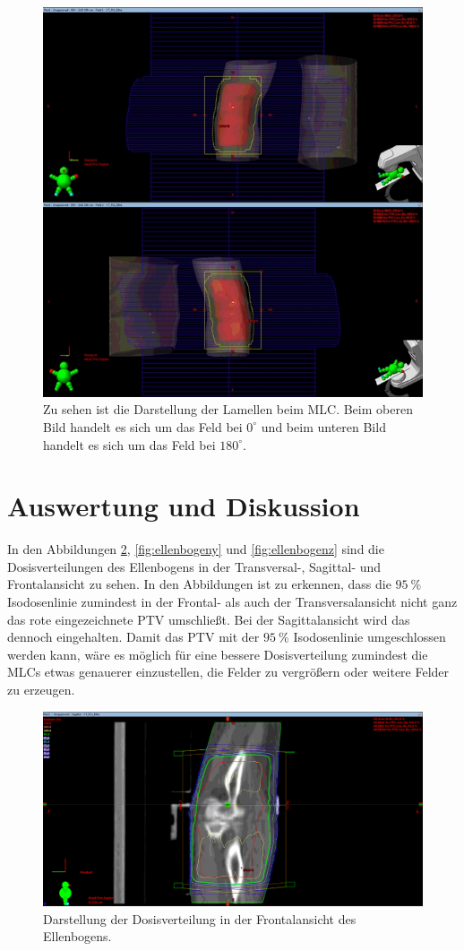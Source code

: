 \begin{figure}[htpb]
	\centering
	\includegraphics[width=0.7\linewidth]{../Bilder/kombi}
	\caption{Zu sehen ist die Darstellung der Lamellen beim MLC. Beim oberen Bild handelt es sich um das Feld bei $0^\circ$ und beim unteren Bild handelt es sich um das Feld bei $180^\circ$.}
	\label{fig:kombi}
\end{figure}


\section{Auswertung und Diskussion}
\label{sec:AuswertundDiskussion}
In den Abbildungen \ref{fig:ellenbogenx}, \ref{fig:ellenbogeny} und \ref{fig:ellenbogenz} sind die Dosisverteilungen des Ellenbogens in der Transversal-, Sagittal- und Frontalansicht zu sehen. In den Abbildungen ist zu erkennen, dass die $\SI{95}{\percent}$ Isodosenlinie zumindest in der Frontal- als auch der Transversalansicht nicht ganz das rote eingezeichnete PTV umschließt. Bei der Sagittalansicht wird das dennoch eingehalten. 
Damit das PTV mit der $\SI{95}{\percent}$ Isodosenlinie umgeschlossen werden kann, wäre es möglich für eine bessere Dosisverteilung zumindest die MLCs etwas genauerer einzustellen, die Felder zu vergrößern oder weitere Felder zu erzeugen.

\begin{figure}[htpb]
	\centering
	\includegraphics[width=0.7\linewidth]{../Bilder/EllenbogenX}
	\caption{Darstellung der Dosisverteilung in der Frontalansicht des Ellenbogens.}
	\label{fig:ellenbogenx}
\end{figure}

